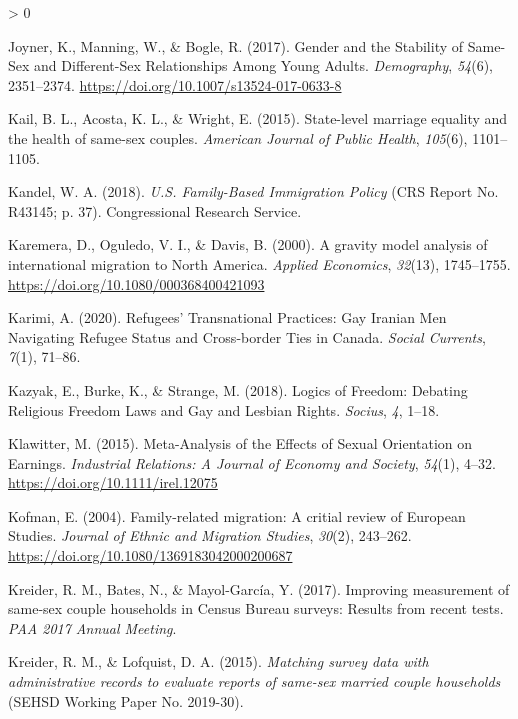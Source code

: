 \documentclass[
  12pt,
]{article}
\newlength{\cslhangindent}
\newenvironment{CSLReferences}[2] %
 {%
  \setlength{\parindent}{0pt}
  \ifodd #1 \everypar{\setlength{\hangindent}{\cslhangindent}}\ignorespaces\fi
  \ifnum #2 > 0
  \setlength{\parskip}{#2\baselineskip}
  \fi
 }%
 {}
\begin{document}
\begin{CSLReferences}{1}{0}
\leavevmode\hypertarget{ref-joyner_2017}{}%
Joyner, K., Manning, W., \& Bogle, R. (2017). Gender and the {Stability} of {Same}-{Sex} and {Different}-{Sex Relationships Among Young Adults}. \emph{Demography}, \emph{54}(6), 2351--2374. \url{https://doi.org/10.1007/s13524-017-0633-8}

\leavevmode\hypertarget{ref-kail_2015}{}%
Kail, B. L., Acosta, K. L., \& Wright, E. (2015). State-level marriage equality and the health of same-sex couples. \emph{American Journal of Public Health}, \emph{105}(6), 1101--1105.

\leavevmode\hypertarget{ref-kandel_2018_familybased}{}%
Kandel, W. A. (2018). \emph{U.{S}. {Family}-{Based Immigration Policy}} (CRS Report No. R43145; p. 37). {Congressional Research Service}.

\leavevmode\hypertarget{ref-karemera_2000}{}%
Karemera, D., Oguledo, V. I., \& Davis, B. (2000). A gravity model analysis of international migration to {North America}. \emph{Applied Economics}, \emph{32}(13), 1745--1755. \url{https://doi.org/10.1080/000368400421093}

\leavevmode\hypertarget{ref-karimi_2020}{}%
Karimi, A. (2020). Refugees' {Transnational Practices}: Gay {Iranian Men Navigating Refugee Status} and {Cross}-border {Ties} in {Canada}. \emph{Social Currents}, \emph{7}(1), 71--86.

\leavevmode\hypertarget{ref-kazyak_2018}{}%
Kazyak, E., Burke, K., \& Strange, M. (2018). Logics of {Freedom}: Debating {Religious Freedom Laws} and {Gay} and {Lesbian Rights}. \emph{Socius}, \emph{4}, 1--18.

\leavevmode\hypertarget{ref-klawitter_2015}{}%
Klawitter, M. (2015). Meta-{Analysis} of the {Effects} of {Sexual Orientation} on {Earnings}. \emph{Industrial Relations: A Journal of Economy and Society}, \emph{54}(1), 4--32. \url{https://doi.org/10.1111/irel.12075}

\leavevmode\hypertarget{ref-kofman_2004_family}{}%
Kofman, E. (2004). Family-related migration: A critial review of {European Studies}. \emph{Journal of Ethnic and Migration Studies}, \emph{30}(2), 243--262. \url{https://doi.org/10.1080/1369183042000200687}

\leavevmode\hypertarget{ref-kreider_2017}{}%
Kreider, R. M., Bates, N., \& Mayol-García, Y. (2017). Improving measurement of same-sex couple households in {Census Bureau} surveys: Results from recent tests. \emph{{PAA} 2017 Annual Meeting}.

\leavevmode\hypertarget{ref-kreider_2015}{}%
Kreider, R. M., \& Lofquist, D. A. (2015). \emph{Matching survey data with administrative records to evaluate reports of same-sex married couple households} (SEHSD Working Paper No. 2019-30).


\end{CSLReferences}
\end{document}
